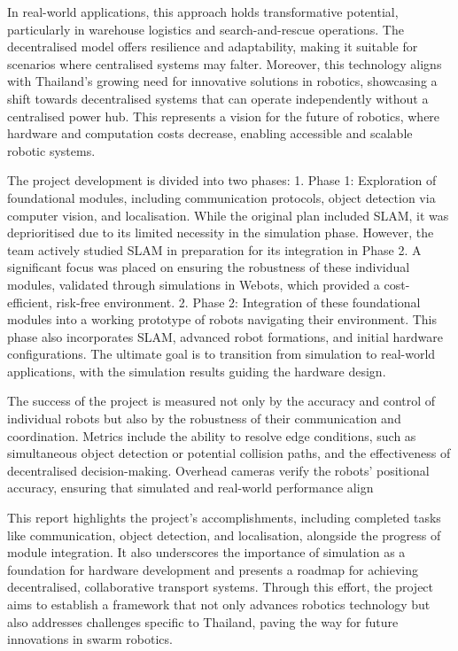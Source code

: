 In real-world applications, this approach holds transformative potential, particularly in warehouse logistics and search-and-rescue operations. The decentralised model offers resilience and adaptability, making it suitable for scenarios where centralised systems may falter. Moreover, this technology aligns with Thailand’s growing need for innovative solutions in robotics, showcasing a shift towards decentralised systems that can operate independently without a centralised power hub. This represents a vision for the future of robotics, where hardware and computation costs decrease, enabling accessible and scalable robotic systems.

The project development is divided into two phases:
	1.	Phase 1: Exploration of foundational modules, including communication protocols, object detection via computer vision, and localisation. While the original plan included SLAM, it was deprioritised due to its limited necessity in the simulation phase. However, the team actively studied SLAM in preparation for its integration in Phase 2. A significant focus was placed on ensuring the robustness of these individual modules, validated through simulations in Webots, which provided a cost-efficient, risk-free environment.
	2.	Phase 2: Integration of these foundational modules into a working prototype of robots navigating their environment. This phase also incorporates SLAM, advanced robot formations, and initial hardware configurations. The ultimate goal is to transition from simulation to real-world applications, with the simulation results guiding the hardware design.

The success of the project is measured not only by the accuracy and control of individual robots but also by the robustness of their communication and coordination. Metrics include the ability to resolve edge conditions, such as simultaneous object detection or potential collision paths, and the effectiveness of decentralised decision-making. Overhead cameras verify the robots’ positional accuracy, ensuring that simulated and real-world performance align

This report highlights the project’s accomplishments, including completed tasks like communication, object detection, and localisation, alongside the progress of module integration. It also underscores the importance of simulation as a foundation for hardware development and presents a roadmap for achieving decentralised, collaborative transport systems. Through this effort, the project aims to establish a framework that not only advances robotics technology but also addresses challenges specific to Thailand, paving the way for future innovations in swarm robotics.

